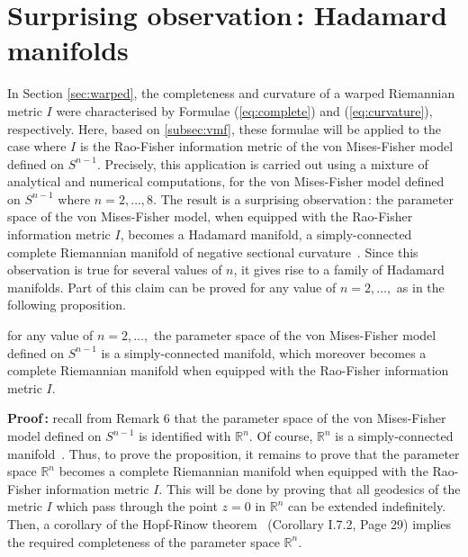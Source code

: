 \documentclass{svmult}
\begin{document}
\section{Surprising observation\,: Hadamard manifolds} \label{sec:hadamard}
In Section \ref{sec:warped}, the completeness and curvature of a warped Riemannian metric $I$ were characterised by Formulae (\ref{eq:complete}) and (\ref{eq:curvature}), respectively. Here, based on \ref{subsec:vmf}, these formulae will be applied to the case where $I$ is the Rao-Fisher information metric of the von Mises-Fisher model defined on $S^{n-1}$. Precisely, this application is carried out using a mixture of analytical and numerical computations, for the von Mises-Fisher model defined on $S^{n-1}$ where $n = 2,\ldots,8$. The result is a surprising observation\,: the parameter space of the von Mises-Fisher model, when equipped with the Rao-Fisher information metric $I$, becomes a Hadamard manifold, a simply-connected complete Riemannian manifold of negative sectional curvature~\cite{petersen}\cite{chavel}. Since this observation is true for several values of $n$, it gives rise to a family of Hadamard manifolds. Part of this claim can be proved for any value of $n = 2,\ldots,$ as in the following proposition.  
\begin{proposition} \label{prop:simpcomplete}
  for any value of $n = 2,\ldots,$ the parameter space of the von Mises-Fisher model defined on $S^{n-1}$ is a simply-connected manifold, which moreover becomes a complete Riemannian manifold when equipped with the Rao-Fisher information metric $I$. 
\end{proposition}
\vspace{0.1cm}
\textbf{Proof\,:} recall from Remark 6 that the parameter space of the von Mises-Fisher model defined on $S^{n-1}$ is identified with $\mathbb{R}^n$. Of course, $\mathbb{R}^n$ is a simply-connected manifold~\cite{spanier}. Thus, to prove the proposition, it remains to prove that the parameter space $\mathbb{R}^n$ becomes a complete Riemannian manifold when equipped with the Rao-Fisher information metric $I$. This will be done by proving that all geodesics of the metric $I$ which pass through the point $z = 0$ in $\mathbb{R}^n$ can be extended indefinitely. Then, a corollary of the Hopf-Rinow theorem~\cite{chavel} (Corollary I.7.2, Page 29) implies the required completeness of the parameter space $\mathbb{R}^n$. 
\end{document}
